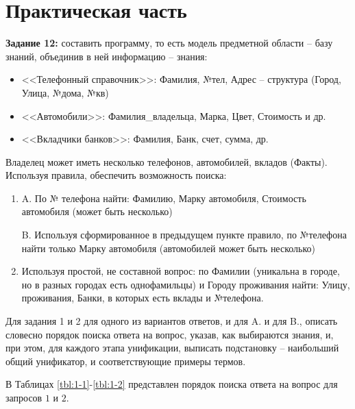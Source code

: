 \chapter{Практическая часть}

\textbf{Задание 12:} составить программу, то есть модель предметной области – базу знаний, объединив в ней информацию – знания:

\begin{itemize}
    \item <<Телефонный справочник>>: Фамилия, №тел, Адрес – структура (Город, Улица, №дома, №кв)
    \item <<Автомобили>>: Фамилия\_владельца, Марка, Цвет, Стоимость и др.
    \item <<Вкладчики банков>>: Фамилия, Банк, счет, сумма, др.
\end{itemize}

Владелец может иметь несколько телефонов, автомобилей, вкладов (Факты).
Используя правила, обеспечить возможность поиска:


\begin{enumerate}
    \item A. По № телефона найти: Фамилию, Марку автомобиля, Стоимость автомобиля (может быть несколько)

        B. Используя сформированное в предыдущем пункте правило, по №телефона найти только Марку автомобиля (автомобилей может быть несколько)

    \item Используя простой, не составной вопрос: по Фамилии (уникальна в городе, но в разных городах есть однофамильцы) и Городу проживания найти: Улицу, проживания, Банки, в которых есть вклады и №телефона.
\end{enumerate}

Для задания 1 и 2 для одного из вариантов ответов, и для A. и для B., описать словесно порядок поиска ответа на вопрос, указав, как выбираются знания, и, при этом, для каждого этапа унификации, выписать подстановку – наибольший общий унификатор, и соответствующие примеры термов.


\clearpage


В Таблицах \ref{tbl:1-1}-\ref{tbl:1-2} представлен порядок поиска ответа на вопрос для запросов \(1\) и \(2\).

